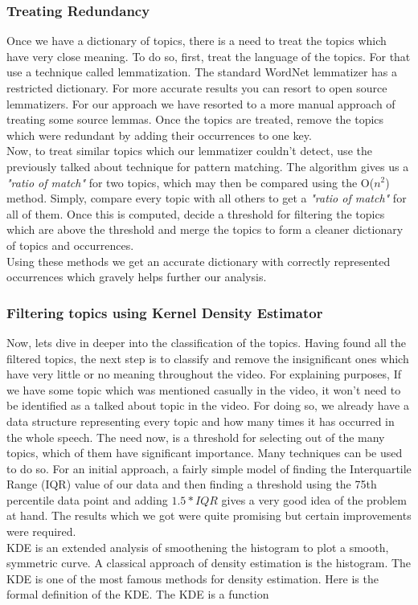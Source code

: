\documentclass[conference]{IEEEtran}
\begin{document}
\subsubsection{\textbf{Treating Redundancy}}
Once we have a dictionary of topics, there is a need to treat the topics which have very close meaning. To do so, first, treat the language of the topics. For that use a technique called lemmatization. \cite{b8} The standard WordNet lemmatizer has a restricted dictionary. For more accurate results you can resort to open source lemmatizers. For our approach we have resorted to a more manual approach of treating some source lemmas. Once the topics are treated, remove the topics which were redundant by adding their occurrences to one key.\\
\indent Now, to treat similar topics which our lemmatizer couldn't detect, use the previously talked about technique for pattern matching. The algorithm gives us a \textit{"ratio of match"} for two topics, which may then be compared using the O($n^2$) method. Simply, compare every topic with all others to get a \textit{"ratio of match"} for all of them. Once this is computed, decide a threshold for filtering the topics which are above the threshold and merge the topics to form a cleaner dictionary of topics and occurrences.\\
\indent Using these methods we get an accurate dictionary with correctly represented occurrences which gravely helps further our analysis.

\subsubsection{\textbf{Filtering topics using Kernel Density Estimator}} 

Now, lets dive in deeper into the classification of the topics. Having found all the filtered topics, the next step is to classify and remove the insignificant ones which have very little or no meaning throughout the video. For explaining purposes, If we have some topic which was mentioned casually in the video, it won’t need to be identified as a talked about topic in the video. For doing so, we already have a data structure representing every topic and how many times it has occurred in the whole speech. The need now, is a threshold for selecting out of the many topics, which of them have significant importance. Many techniques can be used to do so. For an initial approach, a fairly simple model of finding the Interquartile Range (IQR) value of our data and then finding a threshold using the 75th percentile data point and adding $1.5*IQR$ gives a very good idea of the problem at hand. The results which we got were quite promising but certain improvements were required.\\
\indent KDE is an extended analysis of smoothening the histogram to plot a smooth, symmetric curve. A classical approach of density estimation is the histogram. The KDE is one of the most famous methods for density estimation. Here is the formal definition of the KDE. The KDE is a function
\end{document}
